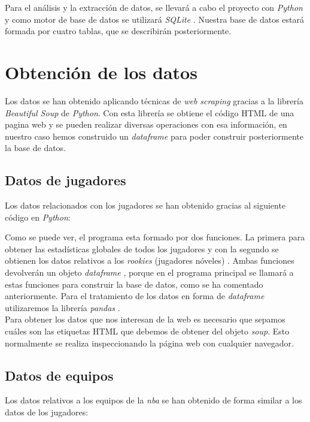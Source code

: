 \documentclass[11pt]{diazessay} %
\begin{document}
Para el análisis y la extracción de datos, se llevará a cabo el proyecto con \textit{Python} \cite{python} y como motor de base de datos se utilizará \textit{SQLite} \cite{sqlite}. Nuestra base de datos estará formada por cuatro tablas, que se describirán posteriormente.

\clearpage

\section*{Obtención de los datos}
Los datos se han obtenido aplicando técnicas de \textit{web scraping} \cite{web_scraping} gracias a la librería \textit{Beautiful Soup} \cite{Beautiful_Soup} de \textit{Python}. Con esta librería se obtiene el código HTML de una pagina web y se pueden realizar diversas operaciones con esa información, en nuestro caso hemos construido un \textit{dataframe} \cite{dataframe} para poder construir posteriormente la base de datos.

\subsection*{Datos de jugadores}
Los datos relacionados con los jugadores se han obtenido gracias al siguiente código \cite{web_scraping_nba} en \textit{Python}:\\


Como se puede ver, el programa esta formado por dos funciones. La primera para obtener las estadísticas globales de todos los jugadores \cite{players_data} y con la segundo se obtienen los datos relativos a los \textit{rookies} (jugadores nóveles) \cite{rookies_data}. Ambas funciones devolverán un objeto \textit{dataframe} \cite{dataframe}, porque en el programa principal se llamará a estas funciones para construir la base de datos, como se ha comentado anteriormente. Para el tratamiento de los datos en forma de \textit{dataframe} utilizaremos la librería \textit{pandas} \cite{pandas}.\\

Para obtener los datos que nos interesan de la web es necesario que sepamos cuáles son las etiquetas HTML que debemos de obtener del objeto \textit{soup}. Esto normalmente se realiza inspeccionando la página web con cualquier navegador.

\subsection*{Datos de equipos}
Los datos relativos a los equipos de la \textit{nba} se han obtenido de forma similar a los datos de los jugadores:
\end{document}
